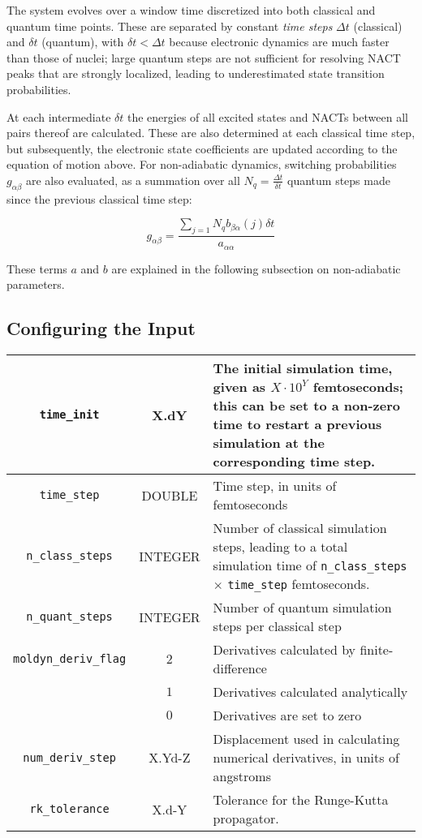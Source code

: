 \documentclass[12pt,letter,footinclude=true,headinclude=true,hyphens,oneside]{book} %
\begin{document}
    The system evolves over a window time discretized into both classical and quantum time points. These are separated by constant \emph{time steps} $\Delta t$ (classical) and $\delta t$ (quantum), with $\delta t < \Delta t$ because electronic dynamics are much faster than those of nuclei; large quantum steps are not sufficient for resolving NACT peaks that are strongly localized, leading to underestimated state transition probabilities.
    
    At each intermediate $\delta t$ the energies of all excited states and NACTs between all pairs thereof are calculated. These are also determined at each classical time step, but subsequently, the electronic state coefficients are updated according to the equation of motion above. For non-adiabatic dynamics, switching probabilities $g_{\alpha \beta}$ are also evaluated, as a summation over all $N_q = \frac{\Delta t}{\delta t}$ quantum steps made since the previous classical time step:
    
    \begin{equation}
    g_{\alpha \beta} = \frac{\sum_{j=1}{N_q} b_{\beta \alpha}(j) \delta t}{a_{\alpha \alpha}}
    \end{equation}
    
    These terms $a$ and $b$ are explained in the following subsection on non-adiabatic parameters.
    
    \subsection{Configuring the Input}
    \label{dynamics-parameters-input}
    
    \begin{tabular}{ | c | c | p{7cm} | }
    \hline
    \texttt{time\_init} & X.dY & The initial simulation time, given as $X \cdot 10^Y$ femtoseconds; this can be set to a non-zero time to restart a previous simulation at the corresponding time step. \\ \hline
    \texttt{time\_step} & DOUBLE & Time step, in units of femtoseconds \\ \hline
    \texttt{n\_class\_steps} & INTEGER & Number of classical simulation steps, leading to a total simulation time of \texttt{n\_class\_steps} $\times$ \texttt{time\_step} femtoseconds. \\ \hline
    \texttt{n\_quant\_steps} & INTEGER & Number of quantum simulation steps per classical step \\ \hline
    \texttt{moldyn\_deriv\_flag} & $2$ & Derivatives calculated by finite-difference \\
    & $1$ &Derivatives calculated analytically \\
    & $0$ &Derivatives are set to zero \\ \hline
    \texttt{num\_deriv\_step} & X.Yd-Z & Displacement used in calculating numerical derivatives, in units of angstroms \\ \hline
    \texttt{rk\_tolerance} & X.d-Y & Tolerance for the Runge-Kutta propagator. \\
    \hline
    \end{tabular}
    
\end{document}
